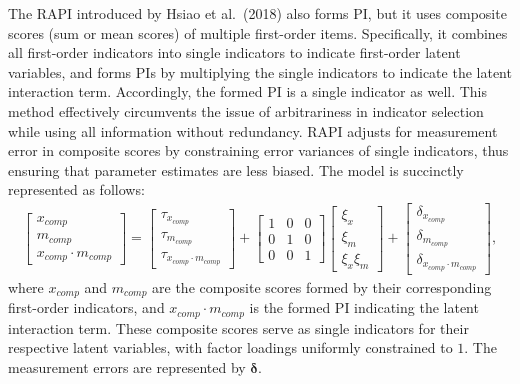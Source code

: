 \documentclass[
  man]{apa6}
\begin{document}
The RAPI introduced by Hsiao et al.~(2018) also forms PI, but it uses composite scores (sum or mean scores) of multiple first-order items. Specifically, it combines all first-order indicators into single indicators to indicate first-order latent variables, and forms PIs by multiplying the single indicators to indicate the latent interaction term. Accordingly, the formed PI is a single indicator as well. This method effectively circumvents the issue of arbitrariness in indicator selection while using all information without redundancy. RAPI adjusts for measurement error in composite scores by constraining error variances of single indicators, thus ensuring that parameter estimates are less biased. The model is succinctly represented as follows:
\begin{align}
    \begin{bmatrix}
        x_{comp} \\
        m_{comp} \\
        x_{comp} \cdot m_{comp}
    \end{bmatrix} = 
    \begin{bmatrix}
        \tau_{x_{comp}} \\
        \tau_{m_{comp}} \\ 
        \tau_{x_{comp} \cdot m_{comp}} 
    \end{bmatrix} + 
    \begin{bmatrix}
        1 & 0 & 0 \\
        0 & 1 & 0 \\ 
        0 & 0 & 1 
    \end{bmatrix}
    \begin{bmatrix}
        \xi_{x} \\  
        \xi_{m} \\ 
        \xi_{x}\xi_{m}
    \end{bmatrix} +
    \begin{bmatrix}
        \delta_{x_{comp}} \\
        \delta_{m_{comp}} \\ 
        \delta_{x_{comp} \cdot m_{comp}}
    \end{bmatrix},
\end{align}
where \(x_{comp}\) and \(m_{comp}\) are the composite scores formed by their corresponding first-order indicators, and \(x_{comp} \cdot m_{comp}\) is the formed PI indicating the latent interaction term. These composite scores serve as single indicators for their respective latent variables, with factor loadings uniformly constrained to \(1\). The measurement errors are represented by \(\mathbf{\delta}\).
\end{document}
